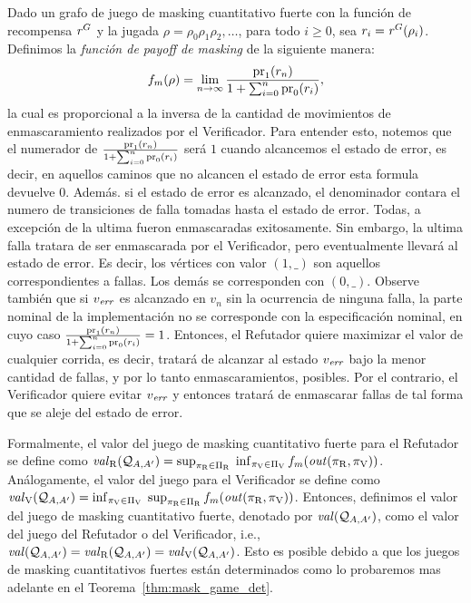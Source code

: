 Dado un grafo de juego de masking cuantitativo fuerte con la función de recompensa $\mathit{r}^G$ y la jugada 
$\rho = \rho_0 \rho_1 \rho_2, \ldots$, para todo $i \geq 0$, sea 
$r_i = \mathit{r}^G(\rho_i)$.
Definimos la \emph{función de payoff de masking} de la siguiente manera: 
\[%
\FMask(\rho) = \lim_{n \rightarrow \infty}  \frac{\pr{1}{r_n}}{1+ \sum^{n}_{i=0} \pr{0}{r_i}},
\]
la cual es proporcional a la inversa de la cantidad de movimientos de enmascaramiento realizados por el Verificador. Para entender esto, notemos que el numerador de $\frac{\operatorname{pr}_{1}(r_n)}{1+ \sum^{n}_{i=0} \operatorname{pr}_{0}(r_i)}$ será $1$
cuando alcancemos el estado de error, es decir, en aquellos caminos que no alcancen el estado de error esta formula devuelve $0$. Además. si el estado de error es alcanzado,  el denominador contara el numero de transiciones de falla tomadas hasta el estado de error. Todas, a excepción de la ultima fueron enmascaradas exitosamente. Sin embargo, la ultima falla tratara de ser enmascarada por el Verificador, pero eventualmente llevará al estado de error.
Es decir, los vértices con valor $(1,\_)$ son aquellos correspondientes a fallas. Los demás se corresponden con $(0,\_)$.
Observe también que si $v_{\mathit{err}}$ es alcanzado en $v_n$ sin la ocurrencia de ninguna falla, la parte nominal de la implementación no se corresponde con la especificación nominal, en cuyo caso $\frac{\operatorname{pr}_{1}(r_n)}{1+ \sum^{n}_{i=0} \operatorname{pr}_{0}(r_i)}=1$.
Entonces, el Refutador quiere maximizar el valor de cualquier corrida, es decir, tratará de alcanzar al estado $v_{\mathit{err}}$ bajo la menor cantidad de fallas, y por lo tanto enmascaramientos, posibles. 
Por el contrario, el Verificador quiere evitar $v_{\mathit{err}}$ y entonces tratará de enmascarar fallas de tal forma que se aleje del estado de error. 

Formalmente, el valor del juego de masking cuantitativo fuerte para el Refutador se define como $\mathit{val}_{\mathrm{R}}(\mathcal{Q}_{A, A'}) = \sup_{\pi_{\mathrm{R}} \in \Pi_{\mathrm{R}}} \; \inf_{\pi_{\mathrm{V}} \in \Pi_{\mathrm{V}}} f_{m}(\mathit{out}(\pi_{\mathrm{R}}, \pi_{\mathrm{V}}))$. Análogamente, el valor del juego para el Verificador se define como $\mathit{val}_{\mathrm{V}}(\mathcal{Q}_{A, A'}) = \inf_{\pi_{\mathrm{V}} \in \Pi_{\mathrm{V}}} \; \sup_{\pi_{\mathrm{R}} \in \Pi_{\mathrm{R}}} f_{m}(\mathit{out}(\pi_{\mathrm{R}}, 
\pi_{\mathrm{V}}))$. Entonces, definimos el valor del juego de masking cuantitativo fuerte, denotado por $\mathit{val}(\mathcal{Q}_{A, A'})$, como el valor del juego del Refutador o del Verificador, i.e., $\mathit{val}(\mathcal{Q}_{A, A'}) = \mathit{val}_{\mathrm{R}}(\mathcal{Q}_{A, A'}) = \mathit{val}_{\mathrm{V}}(\mathcal{Q}_{A, A'})$. Esto es posible debido a que los juegos de masking cuantitativos fuertes están determinados como lo probaremos mas adelante en el Teorema~\ref{thm:mask_game_det}. \\

